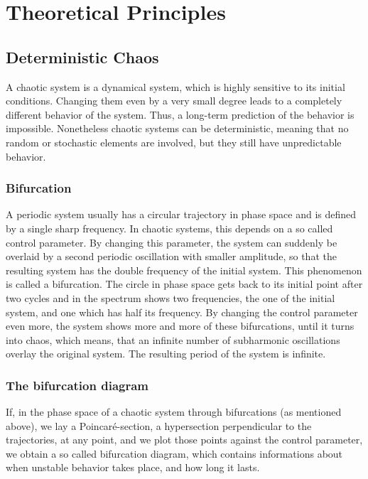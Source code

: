 \section{Theoretical Principles}

\subsection{Deterministic Chaos}

A chaotic system is a dynamical system, which is highly sensitive to its initial conditions. Changing them even by a very small degree leads to a completely different behavior of the system. Thus, a long-term prediction of the behavior is impossible. Nonetheless chaotic systems can be deterministic, meaning that no random or stochastic elements are involved, but they still have unpredictable behavior.

\subsubsection{Bifurcation}

A periodic system usually has a circular trajectory in phase space and is defined by a single sharp frequency. In chaotic systems, this depends on a so called control parameter. By changing this parameter, the system can suddenly be overlaid by a second periodic oscillation with smaller amplitude, so that the resulting system has the double frequency of the initial system. This phenomenon is called a bifurcation. The circle in phase space gets back to its initial point after two cycles and in the spectrum shows two frequencies, the one of the initial system, and one which has half its frequency. By changing the control parameter even more, the system shows more and more of these bifurcations, until it turns into chaos, which means, that an infinite number of subharmonic oscillations overlay the original system. The resulting period of the system is infinite.

\subsubsection{The bifurcation diagram}

If, in the phase space of a chaotic system through bifurcations (as mentioned above), we lay a Poincaré-section, a hypersection perpendicular to the trajectories, at any point, and we plot those points against the control parameter, we obtain a so called bifurcation diagram, which contains informations about when unstable behavior takes place, and how long it lasts.

